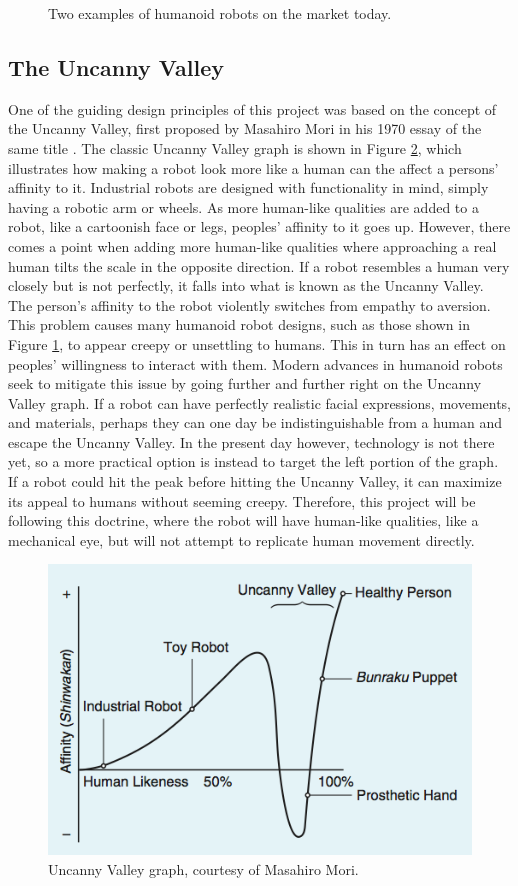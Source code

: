 \begin{figure}[h]
\begin{subfigure}{0.3\linewidth}
    \end{subfigure}
    \caption{Two examples of humanoid robots on the market today.}
    \label{fig:humanoid}
\end{figure}

\subsection{The Uncanny Valley}
One of the guiding design principles of this project was based on the concept of the Uncanny Valley, first proposed by Masahiro Mori in his 1970 essay of the same title \cite{masahiromoriUncannyValleyOriginal2012}. The classic Uncanny Valley graph is shown in Figure \ref{fig:uncanny valley}, which illustrates how making a robot look more like a human can the affect a persons' affinity to it. Industrial robots are designed with functionality in mind, simply having a robotic arm or wheels. As more human-like qualities are added to a robot, like a cartoonish face or legs, peoples' affinity to it goes up. However, there comes a point when adding more human-like qualities where approaching a real human tilts the scale in the opposite direction. If a robot resembles a human very closely but is not perfectly, it falls into what is known as the Uncanny Valley. The person's affinity to the robot violently switches from empathy to aversion. This problem causes many humanoid robot designs, such as those shown in Figure \ref{fig:humanoid}, to appear creepy or unsettling to humans. This in turn has an effect on peoples' willingness to interact with them. Modern advances in humanoid robots seek to mitigate this issue by going further and further right on the Uncanny Valley graph. If a robot can have perfectly realistic facial expressions, movements, and materials, perhaps they can one day be indistinguishable from a human and escape the Uncanny Valley. In the present day however, technology is not there yet, so a more practical option is instead to target the left portion of the graph. If a robot could hit the peak before hitting the Uncanny Valley, it can maximize its appeal to humans without seeming creepy. Therefore, this project will be following this doctrine, where the robot will have human-like qualities, like a mechanical eye, but will not attempt to replicate human movement directly.


\begin{figure}[h]
    \centering
    \includegraphics[width=0.6\linewidth]{Thesis/ch1/uncanny-valley.png}
    \caption{Uncanny Valley graph, courtesy of Masahiro Mori.}
    \label{fig:uncanny valley}
\end{figure}

